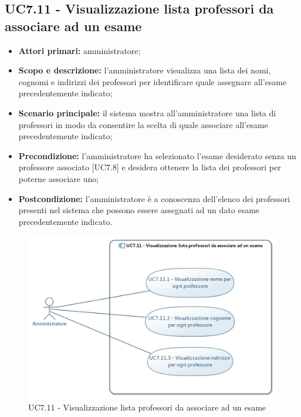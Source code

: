 \documentclass[AnalisiDeiRequisiti.tex]{subfiles}
\begin{document}
\subsection{UC7.11 - Visualizzazione lista professori da associare ad un esame}
\begin{itemize}
	\item \textbf{Attori primari:} amministratore;
	\item \textbf{Scopo e descrizione:} l'amministratore visualizza una lista dei nomi, cognomi e indirizzi dei professori per identificare quale assegnare all'esame precedentemente indicato;
	\item \textbf{Scenario principale:} il sistema mostra all'amministratore una lista di professori in modo da consentire la scelta di quale associare all'esame precedentemente indicato;
	\item \textbf{Precondizione:} l'amministratore ha selezionato l'esame desiderato senza un professore associato [UC7.8] e desidera ottenere la lista dei professori per poterne associare uno;  
	\item \textbf{Postcondizione:} l'amministratore è a conoscenza dell'elenco dei professori presenti nel sistema che possono essere assegnati ad un dato esame precedentemente indicato.
\end{itemize}
\begin{figure}[H]
	\centering
	\includegraphics[width=0.7\linewidth]{UC7_11.jpg}
	\caption{UC7.11 - Visualizzazione lista professori da associare ad un esame}
	\label{UC7.11 - Visualizzazione lista professori da associare ad un esame}
\end{figure}
\end{document}
